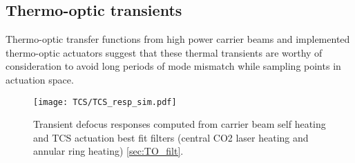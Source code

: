 \subsection{Thermo-optic transients}
Thermo-optic transfer functions from high power carrier beams and implemented thermo-optic actuators suggest that these thermal transients are worthy of consideration to avoid long periods of mode mismatch while sampling points in actuation space.
\begin{figure}[H]
  \centering
  \begin{subcaptiongroup}
	  \texttt{[image: TCS/TCS\_resp\_sim.pdf]}
	  \label{TO_response}
  \end{subcaptiongroup}
  \captionsetup{subrefformat=parens}
  \hfill
  \caption{Transient defocus responses computed from carrier beam self heating and TCS actuation best fit filters (central CO2 laser heating and annular ring heating) \autoref{sec:TO_filt}.} 
\label{fig:thermooptic_response}
\end{figure}

